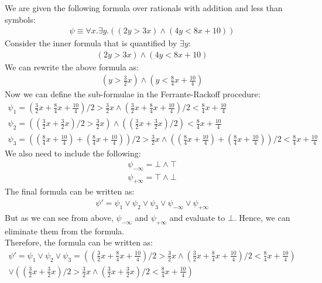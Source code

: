 \documentclass[12pt,letterpaper, onecolumn]{exam}
\begin{document}
\begin{questions}
	We are given the following formula over rationals with addition and less than symbols: \\
	\begin{align*}
		\psi \equiv \forall x. \exists y. ((2y > 3x) \land (4y < 8x + 10))
	\end{align*}
	Consider the inner formula that is quantified by $ \exists y $:
	\begin{align*}
		(2y > 3x) \land (4y < 8x + 10)
	\end{align*}
	We can rewrite the above formula as:
	\begin{align*}
		(y > \frac{3}{2}x) \land (y < \frac{8}{4}x + \frac{10}{4})
	\end{align*}
	Now we can define the sub-formulae in the Ferrante-Rackoff procedure:
	\begin{align*}
		\psi_1 = (\frac{3}{2}x + \frac{8}{4}x + \frac{10}{4}) / 2 > \frac{3}{2}x \land (\frac{3}{2}x + \frac{8}{4}x + \frac{10}{4}) / 2 < \frac{8}{4}x + \frac{10}{4} \\
		\psi_2 = ((\frac{3}{2}x + \frac{3}{2}x) / 2 > \frac{3}{2}x) \land ((\frac{3}{2}x + \frac{3}{2}x) / 2) < \frac{8}{4}x + \frac{10}{4} \\
		\psi_3 = ((\frac{8}{4}x + \frac{10}{4}) + (\frac{8}{4}x + \frac{10}{4})) / 2 > \frac{3}{2}x \land ((\frac{8}{4}x + \frac{10}{4}) + (\frac{8}{4}x + \frac{10}{4})) / 2 < \frac{8}{4}x + \frac{10}{4}
	\end{align*}
	We also need to include the following:
	\begin{align*}
		\psi_{-\infty} = \bot \land \top \\
		\psi_{+\infty} = \top \land \bot
	\end{align*}
	The final formula can be written as:
	\begin{align*}
		\psi' = \psi_1 \lor \psi_2 \lor \psi_3 \lor \psi_{-\infty} \lor \psi_{+\infty}
	\end{align*}
	But as we can see from above, $ \psi_{-\infty} $ and $\psi_{+\infty}$ and evaluate to $ \bot $. Hence, we can eliminate them from the formula. \\
	Therefore, the formula can be written as:
	\begin{align*}
		\psi' = \psi_1 \lor \psi_2 \lor \psi_3
		      = ((\frac{3}{2}x + \frac{8}{4}x + \frac{10}{4}) / 2 > \frac{3}{2}x \land (\frac{3}{2}x + \frac{8}{4}x + \frac{10}{4}) / 2 < \frac{8}{4}x + \frac{10}{4}) \\
				\lor ((\frac{3}{2}x + \frac{3}{2}x) / 2 > \frac{3}{2}x \land (\frac{3}{2}x + \frac{3}{2}x) / 2 < \frac{8}{4}x + \frac{10}{4}) \\

\end{align*}
\end{questions}
\end{document}
